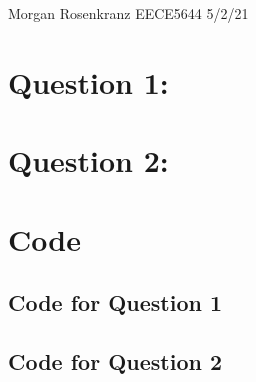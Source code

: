 \documentclass[11pt]{article}
\begin{document}
Morgan Rosenkranz 
EECE5644 
5/2/21 

\section*{Question 1:}


\section*{Question 2:}


\section*{Code}
\subsection*{Code for Question 1}


\subsection*{Code for Question 2}

\end{document}

